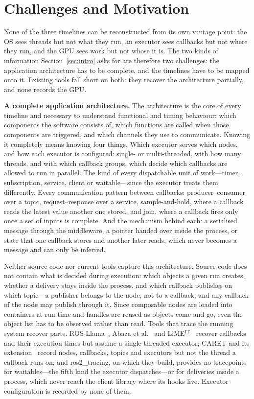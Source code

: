 \section{Challenges and Motivation}
\label{sec:goal}
None of the three timelines can be reconstructed from its own vantage point: the OS sees threads but not what they run, an executor sees callbacks but not where they run, and the GPU sees work but not whose it is. The two kinds of information Section~\ref{sec:intro} asks for are therefore two challenges: the application architecture has to be complete, and the timelines have to be mapped onto it. Existing tools fall short on both: they recover the architecture partially, and none records the GPU.

\noindent\textbf{A complete application architecture.} The architecture is the core of every timeline and necessary to understand functional and timing behaviour: which components the software consists of, which functions are called when those components are triggered, and which channels they use to communicate. Knowing it completely means knowing four things. Which executor serves which nodes, and how each executor is configured: single- or multi-threaded, with how many threads, and with which callback groups, which decide which callbacks are allowed to run in parallel. The kind of every dispatchable unit of work---timer, subscription, service, client or waitable---since the executor treats them differently. Every communication pattern between callbacks: producer--consumer over a topic, request--response over a service, sample-and-hold, where a callback reads the latest value another one stored, and join, where a callback fires only once a set of inputs is complete. And the mechanism behind each: a serialised message through the middleware, a pointer handed over inside the process, or state that one callback stores and another later reads, which never becomes a message and can only be inferred.

Neither source code nor current tools capture this architecture. Source code does not contain what is decided during execution: which objects a given run creates, whether a delivery stays inside the process, and which callback publishes on which topic---a publisher belongs to the node, not to a callback, and any callback of the node may publish through it. Since composable nodes are loaded into containers at run time and handles are reused as objects come and go, even the object list has to be observed rather than read. Tools that trace the running system recover parts. ROS-Llama~\cite{blass-2021-rosllama-paper}, Abaza et al.~\cite{abaza-2024-ros2modelsynthesis} and LiME$^{\text{IT}}$~\cite{brandenburg-2026-limeit} recover callbacks and their execution times but assume a single-threaded executor; CARET and its extension~\cite{kuboichi-2022-caret,peng-2022-caretcomp} record nodes, callbacks, topics and executors but not the thread a callback runs on; and ros2\_tracing, on which they build, provides no tracepoints for waitables---the fifth kind the executor dispatches---or for deliveries inside a process, which never reach the client library where its hooks live. Executor configuration is recorded by none of them.

